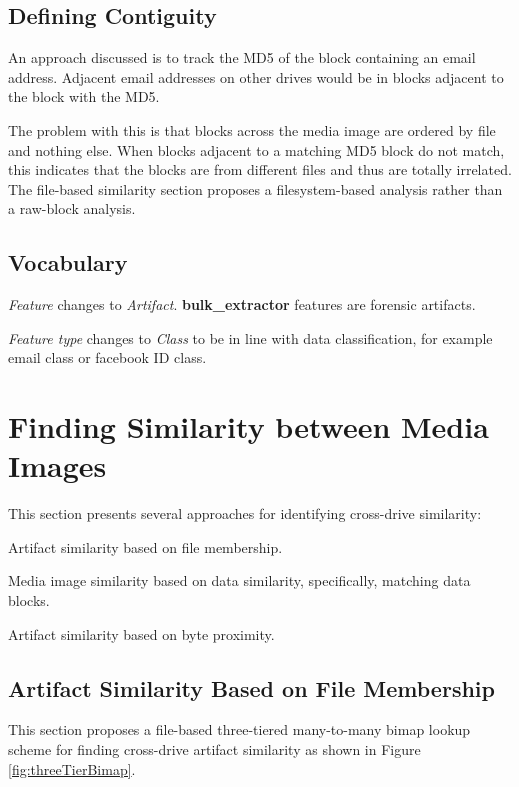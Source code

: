 \documentclass[12pt,twoside]{article}
\newcommand \bulk {\textbf{bulk\_extractor}\xspace}
\begin{document}
\subsection{Defining Contiguity}
An approach discussed is to track the MD5 of the block containing an email address.  Adjacent email addresses on other drives would be in blocks adjacent to the block with the MD5.

The problem with this is that blocks across the media image are ordered by file and nothing else.  When blocks adjacent to a matching MD5 block do not match, this indicates that the blocks are from different files and thus are totally irrelated.  The file-based similarity section proposes a filesystem-based analysis rather than a raw-block analysis.

\subsection{Vocabulary}
\begin{compactitem}
\item \textit{Feature} changes to \textit{Artifact}.  \bulk features are forensic artifacts.
\item \textit{Feature type} changes to \textit{Class} to be in line with data classification, for example email class or facebook ID class.
\end{compactitem}

\section{Finding Similarity between Media Images}
This section presents several approaches for identifying cross-drive similarity:
\begin{compactitem}
\item Artifact similarity based on file membership.
\item Media image similarity based on data similarity, specifically, matching data blocks.
\item Artifact similarity based on byte proximity.
\end{compactitem}


\subsection{Artifact Similarity Based on File Membership}
This section proposes a file-based three-tiered many-to-many bimap lookup scheme for finding cross-drive artifact similarity as shown in Figure \ref{fig:threeTierBimap}.
\end{document}
